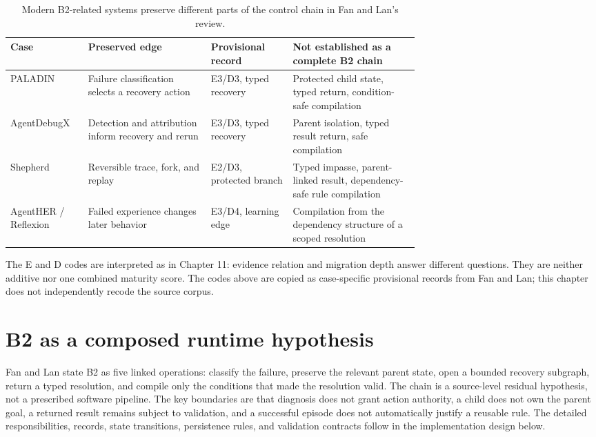 \begin{table}[tbp]
\centering
\small
\caption{Modern B2-related systems preserve different parts of the control chain in Fan and Lan's review.}
\label{tab:ch13-modern-baselines}
\begin{tabularx}{\linewidth}{@{}p{0.19\linewidth}p{0.30\linewidth}p{0.20\linewidth}X@{}}
\toprule
\textbf{Case} & \textbf{Preserved edge} & \textbf{Provisional record} & \textbf{Not established as a complete B2 chain} \\
\midrule
PALADIN & Failure classification selects a recovery action & E3/D3, typed recovery & Protected child state, typed return, condition-safe compilation \\
AgentDebugX & Detection and attribution inform recovery and rerun & E3/D3, typed recovery & Parent isolation, typed result return, safe compilation \\
Shepherd & Reversible trace, fork, and replay & E2/D3, protected branch & Typed impasse, parent-linked result, dependency-safe rule compilation \\
AgentHER / Reflexion & Failed experience changes later behavior & E3/D4, learning edge & Compilation from the dependency structure of a scoped resolution \\
\bottomrule
\end{tabularx}
\end{table}

The E and D codes are interpreted as in Chapter 11: evidence relation and migration depth answer different questions. They are neither additive nor one combined maturity score. The codes above are copied as case-specific provisional records from Fan and Lan; this chapter does not independently recode the source corpus.


\section{B2 as a composed runtime hypothesis}
\label{sec:ch13-b2-hypothesis}

Fan and Lan state B2 as five linked operations: classify the failure, preserve the relevant parent state, open a bounded recovery subgraph, return a typed resolution, and compile only the conditions that made the resolution valid. The chain is a source-level residual hypothesis, not a prescribed software pipeline. The key boundaries are that diagnosis does not grant action authority, a child does not own the parent goal, a returned result remains subject to validation, and a successful episode does not automatically justify a reusable rule. The detailed responsibilities, records, state transitions, persistence rules, and validation contracts follow in the implementation design below.

